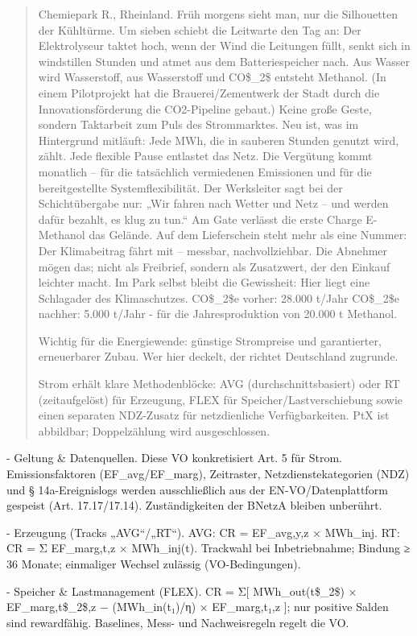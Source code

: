 \documentclass[12pt,a4paper]{scrartcl}
\begin{document}
\begin{quote}
Chemiepark R., Rheinland. Früh morgens sieht man, nur die Silhouetten der Kühltürme. Um sieben schiebt die Leitwarte den Tag an: Der Elektrolyseur taktet hoch, wenn der Wind die Leitungen füllt, senkt sich in windstillen Stunden und atmet aus dem Batteriespeicher nach. Aus Wasser wird Wasserstoff, aus Wasserstoff und CO\$\_2\$ entsteht Methanol. (In einem Pilotprojekt hat die Brauerei/Zementwerk der Stadt durch die Innovationsförderung die CO2-Pipeline gebaut.) Keine große Geste, sondern Taktarbeit zum Puls des Strommarktes. Neu ist, was im Hintergrund mitläuft: Jede MWh, die in sauberen Stunden genutzt wird, zählt. Jede flexible Pause entlastet das Netz. Die Vergütung kommt monatlich -- für die tatsächlich vermiedenen Emissionen und für die bereitgestellte Systemflexibilität. Der Werksleiter sagt bei der Schichtübergabe nur: „Wir fahren nach Wetter und Netz -- und werden dafür bezahlt, es klug zu tun.“ Am Gate verlässt die erste Charge E-Methanol das Gelände. Auf dem Lieferschein steht mehr als eine Nummer: Der Klimabeitrag fährt mit -- messbar, nachvollziehbar. Die Abnehmer mögen das; nicht als Freibrief, sondern als Zusatzwert, der den Einkauf leichter macht. Im Park selbst bleibt die Gewissheit: Hier liegt eine Schlagader des Klimaschutzes. CO\$\_2\$e vorher: 28.000 t/Jahr CO\$\_2\$e nachher: 5.000 t/Jahr - für  die Jahresproduktion von 20.000 t Methanol.

  Wichtig für die Energiewende: günstige Strompreise und garantierter, erneuerbarer Zubau. Wer hier deckelt, der richtet Deutschland zugrunde. 

  Strom erhält klare Methodenblöcke: AVG (durchschnittsbasiert) oder RT (zeitaufgelöst) für Erzeugung, FLEX für Speicher/Lastverschiebung sowie einen separaten NDZ-Zusatz für netzdienliche Verfügbarkeiten. PtX ist abbildbar; Doppelzählung wird ausgeschlossen.
\end{quote}

- Geltung \& Datenquellen. Diese VO konkretisiert Art. 5 für Strom. Emissionsfaktoren (EF\_avg/EF\_marg), Zeitraster, Netzdienstekategorien (NDZ) und § 14a-Ereignislogs werden ausschließlich aus der EN-VO/Datenplattform gespeist (Art. 17.17/17.14). Zuständigkeiten der BNetzA bleiben unberührt.

- Erzeugung (Tracks „AVG“/„RT“). AVG: CR = EF\_avg,y,z × MWh\_inj. RT: CR = Σ EF\_marg,t,z × MWh\_inj(t). Trackwahl bei Inbetriebnahme; Bindung ≥ 36 Monate; einmaliger Wechsel zulässig (VO-Bedingungen).

- Speicher \& Lastmanagement (FLEX). CR = Σ[ MWh\_out(t\$\_2\$) × EF\_marg,t\$\_2\$,z − (MWh\_in(t₁)/η) × EF\_marg,t₁,z ]; nur positive Salden sind rewardfähig. Baselines, Mess- und Nachweisregeln regelt die VO.
\end{document}

